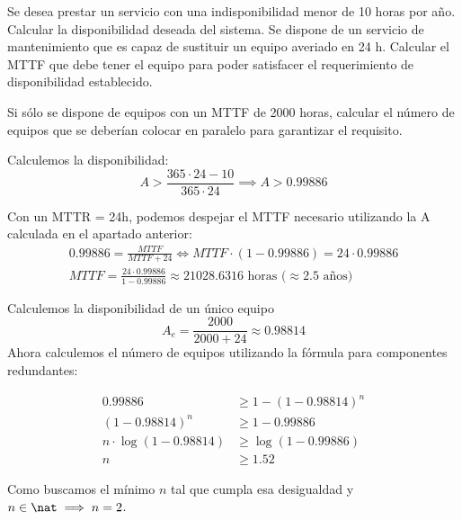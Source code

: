 \begin{problem}[2]
Se desea prestar un servicio con una indisponibilidad menor de 10 horas por año.
  \ppart Calcular la disponibilidad deseada del sistema.
  \ppart Se dispone de un servicio de mantenimiento que es capaz de sustituir un equipo averiado en 24 h. Calcular el MTTF que debe tener el equipo para poder satisfacer el requerimiento de disponibilidad establecido.

  \ppart Si sólo se dispone de equipos con un MTTF de 2000 horas, calcular el número de equipos que se deberían colocar en paralelo para garantizar el requisito.

\solution

\spart
  Calculemos la disponibilidad:
  \[ A > \frac{365\cdot24-10}{365\cdot24} \implies A > 0.99886 \]

\spart
	Con un MTTR = 24h, podemos despejar el MTTF necesario utilizando la A calculada en el apartado anterior:
	\begin{gather*}
	0.99886 = \frac{\textit{MTTF}}{\textit{MTTF}+24} \iff \textit{MTTF} · (1-0.99886)=24\cdot0.99886\\
	\textit{MTTF} = \frac{24\cdot0.99886}{1-0.99886} \approx 21028.6316 \text{ horas (} \approx\text{2.5 años)}
	\end{gather*}

\spart
	Calculemos la disponibilidad de un único equipo
	\[ A_e = \frac{2000}{2000+24} \approx 0.98814 \]
	Ahora calculemos el número de equipos utilizando la fórmula para componentes redundantes:

	\begin{align*}
	0.99886 &\geq 1 - (1 - 0.98814)^n \\
	(1 - 0.98814)^n &\geq 1 - 0.99886\\
	n\cdot \log(1 - 0.98814) &\geq  \log(1 - 0.99886) \\
	n &\geq 1.52
	\end{align*}

	Como buscamos el mínimo $n$ tal que cumpla esa desigualdad y $n \in \nat \implies n = 2$.

\end{problem}

